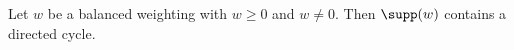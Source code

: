 \begin{lemma}[Support]\label{sh-0401}
Let $w$ be a balanced weighting with $w \geq 0$ and $w \neq 0$. Then $\supp(w)$ contains a directed cycle.
\end{lemma}